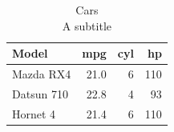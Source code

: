 \begin{table}[t]
\caption*{
{\fontsize{20}{25}\selectfont  Cars\fontsize{12}{15}\selectfont } \\ 
{\fontsize{14}{17}\selectfont  A subtitle\fontsize{12}{15}\selectfont }
} 
\fontsize{12.0pt}{14.0pt}\selectfont
\begin{tabular*}{\linewidth}{@{\extracolsep{\fill}}lrrr}
\toprule
Model & mpg & cyl & hp \\ 
\midrule\addlinespace[2.5pt]
Mazda RX4 & 21.0 & 6 & 110 \\ 
Datsun 710 & 22.8 & 4 & 93 \\ 
Hornet 4 & 21.4 & 6 & 110 \\ 
\bottomrule
\end{tabular*}
\end{table}

